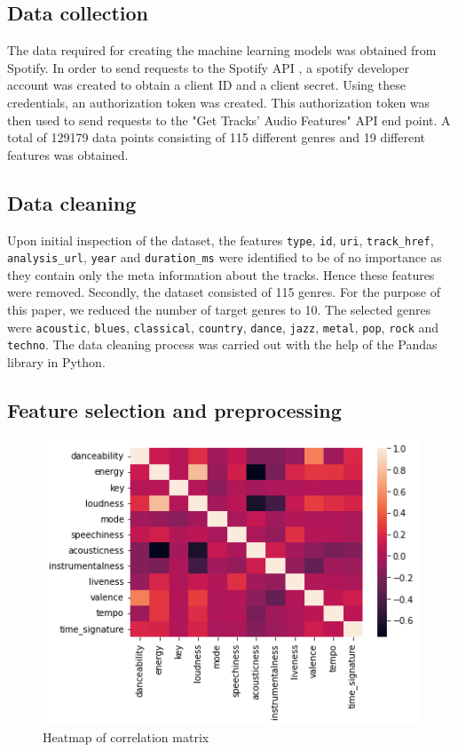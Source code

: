 \documentclass[conference]{IEEEtran}
\begin{document}
\subsection{Data collection}
\label{sec:org54edca5}

The data required for creating the machine learning models was obtained from Spotify. In order to send requests to the Spotify API \cite{spotify} , a spotify developer account was created to obtain a client ID and a client secret. Using these credentials, an authorization token was created. This authorization token was then used to send requests to the "Get Tracks' Audio Features" API end point. A total of 129179 data points consisting of 115 different genres and 19 different features was obtained.

\subsection{Data cleaning}
\label{sec:org49ebdf6}

Upon initial inspection of the dataset, the features \texttt{type}, \texttt{id}, \texttt{uri}, \texttt{track\_href}, \texttt{analysis\_url}, \texttt{year} and \texttt{duration\_ms} were identified to be of no importance as they contain only the meta information about the tracks. Hence these features were removed. Secondly, the dataset consisted of 115 genres. For the purpose of this paper, we reduced the number of target genres to 10. The selected genres were \texttt{acoustic}, \texttt{blues}, \texttt{classical}, \texttt{country}, \texttt{dance}, \texttt{jazz}, \texttt{metal}, \texttt{pop}, \texttt{rock} and \texttt{techno}. The data cleaning process was carried out with the help of the Pandas \cite{reback2020pandas} library in Python.

\subsection{Feature selection and preprocessing}
\label{sec:orgd85df5e}

\begin{figure}[htbp]
\centering
\includegraphics[width=.9\linewidth]{./images/heat_map.png}
\caption{Heatmap of correlation matrix}
\end{figure}
\end{document}
